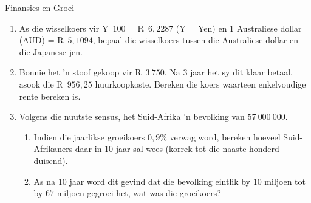 \begin{eocexercises}{Finansies en Groei}
\begin{enumerate}[label=\textbf{\arabic*}.]
	\item As die wisselkoers vir ¥~$100$ = R~$6,2287$ (¥ = Yen) en 1 Australiese dollar (AUD) = R~$5,1094$, bepaal die wisselkoers
tussen die Australiese dollar en die Japanese jen.
	\item Bonnie het ’n stoof gekoop vir R~$3~750$. Na 3 jaar het sy dit klaar betaal, asook die R~$956,25$ huurkoopkoste.
Bereken die koers waarteen enkelvoudige rente bereken is.
	\item Volgens die nuutste sensus, het Suid-Afrika 'n bevolking van $57~000~000$.
	\begin{enumerate}[noitemsep, label=\textbf{(\alph*)} ]
	    \item Indien die jaarlikse groeikoers $0,9\%$ verwag word, bereken hoeveel Suid-Afrikaners daar in $10$ jaar sal wees (korrek tot die naaste honderd duisend).

	    \item As na 10 jaar word dit gevind dat die bevolking eintlik by $10$ miljoen tot by $67$ miljoen gegroei het, wat was die groeikoers?
	\end{enumerate}

    \end{enumerate}

\end{eocexercises}
